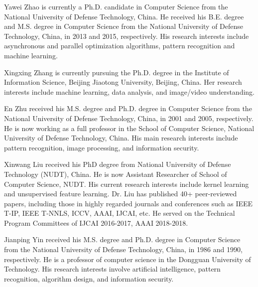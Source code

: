 \documentclass[journal]{IEEEtran}
\begin{document}





\begin{IEEEbiography}{Yawei Zhao} is currently a Ph.D. candidate in Computer Science from the National University of Defense Technology, China. He received his B.E. degree and M.S. degree in Computer Science from the National University of Defense Technology, China, in 2013 and 2015, respectively. His research interests include asynchronous and parallel optimization algorithms, pattern recognition and machine learning.
\end{IEEEbiography}

\begin{IEEEbiography}{Xingxing Zhang} is currently pursuing the Ph.D. degree in the Institute of Information Science, Beijing Jiaotong University, Beijing, China. Her research interests include machine learning, data analysis, and image/video understanding.
\end{IEEEbiography}
 

\begin{IEEEbiography}{En Zhu} received his M.S. degree and Ph.D. degree in Computer Science from the National University of Defense Technology, China, in 2001 and 2005, respectively. He is now working as a full professor in the School of Computer Science, National University of Defense Technology, China. His main research interests include pattern recognition, image processing, and information security.
\end{IEEEbiography}

\begin{IEEEbiography}{Xinwang Liu} received his PhD degree from National University of Defense Technology (NUDT), China. He is now Assistant Researcher of School of Computer Science, NUDT. His current research interests include kernel learning and unsupervised feature learning. Dr. Liu has published 40+ peer-reviewed papers, including those in highly regarded journals and conferences such as IEEE T-IP, IEEE T-NNLS, ICCV, AAAI, IJCAI, etc. He served on the Technical Program Committees of IJCAI 2016-2017, AAAI 2018-2018.
\end{IEEEbiography}




\begin{IEEEbiography}{Jianping Yin} received his M.S. degree and Ph.D. degree in Computer Science from the National University of Defense Technology, China, in 1986 and 1990, respectively. He is a professor of computer science in the Dongguan University of Technology. His research interests involve artificial intelligence, pattern recognition, algorithm design, and information security.
\end{IEEEbiography}



\end{document}
